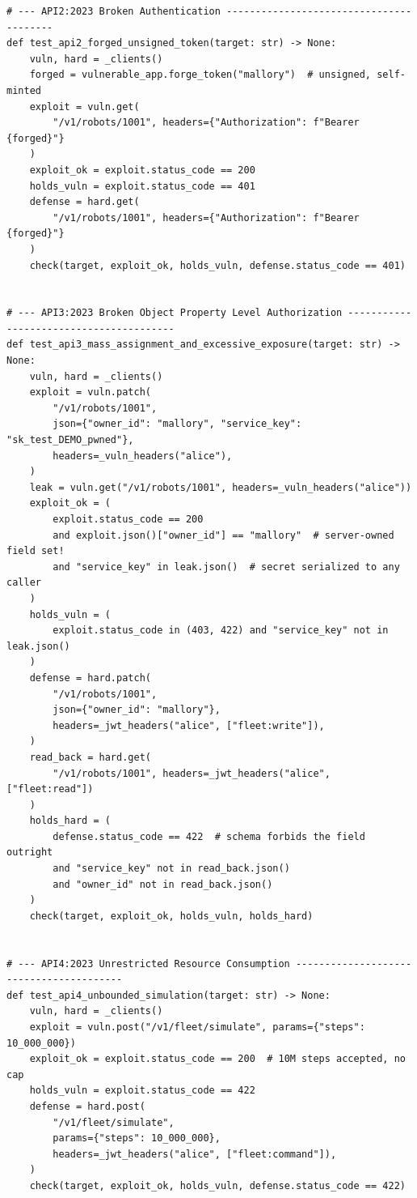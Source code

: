 \begin{verbatim}
# --- API2:2023 Broken Authentication ----------------------------------------
def test_api2_forged_unsigned_token(target: str) -> None:
    vuln, hard = _clients()
    forged = vulnerable_app.forge_token("mallory")  # unsigned, self-minted
    exploit = vuln.get(
        "/v1/robots/1001", headers={"Authorization": f"Bearer {forged}"}
    )
    exploit_ok = exploit.status_code == 200
    holds_vuln = exploit.status_code == 401
    defense = hard.get(
        "/v1/robots/1001", headers={"Authorization": f"Bearer {forged}"}
    )
    check(target, exploit_ok, holds_vuln, defense.status_code == 401)


# --- API3:2023 Broken Object Property Level Authorization ----------------------------------------
def test_api3_mass_assignment_and_excessive_exposure(target: str) -> None:
    vuln, hard = _clients()
    exploit = vuln.patch(
        "/v1/robots/1001",
        json={"owner_id": "mallory", "service_key": "sk_test_DEMO_pwned"},
        headers=_vuln_headers("alice"),
    )
    leak = vuln.get("/v1/robots/1001", headers=_vuln_headers("alice"))
    exploit_ok = (
        exploit.status_code == 200
        and exploit.json()["owner_id"] == "mallory"  # server-owned field set!
        and "service_key" in leak.json()  # secret serialized to any caller
    )
    holds_vuln = (
        exploit.status_code in (403, 422) and "service_key" not in leak.json()
    )
    defense = hard.patch(
        "/v1/robots/1001",
        json={"owner_id": "mallory"},
        headers=_jwt_headers("alice", ["fleet:write"]),
    )
    read_back = hard.get(
        "/v1/robots/1001", headers=_jwt_headers("alice", ["fleet:read"])
    )
    holds_hard = (
        defense.status_code == 422  # schema forbids the field outright
        and "service_key" not in read_back.json()
        and "owner_id" not in read_back.json()
    )
    check(target, exploit_ok, holds_vuln, holds_hard)


# --- API4:2023 Unrestricted Resource Consumption ----------------------------------------
def test_api4_unbounded_simulation(target: str) -> None:
    vuln, hard = _clients()
    exploit = vuln.post("/v1/fleet/simulate", params={"steps": 10_000_000})
    exploit_ok = exploit.status_code == 200  # 10M steps accepted, no cap
    holds_vuln = exploit.status_code == 422
    defense = hard.post(
        "/v1/fleet/simulate",
        params={"steps": 10_000_000},
        headers=_jwt_headers("alice", ["fleet:command"]),
    )
    check(target, exploit_ok, holds_vuln, defense.status_code == 422)



\end{verbatim}
